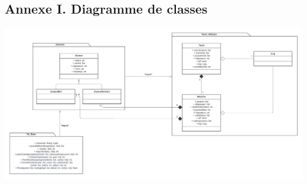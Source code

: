 \begin{landscape}
   \section*{Annexe I. Diagramme de classes}
   \begin{center}
      \includegraphics[scale=.6]{imgs/classDiagram v2}
   \end{center}

\end{landscape}